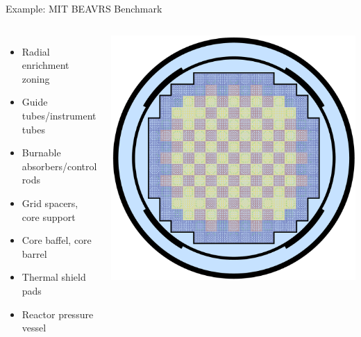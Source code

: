 \documentclass[noamssymb,svgnames]{beamer}
\begin{document}
\begin{frame}{Example: MIT BEAVRS Benchmark}
  \begin{columns}
    \small
    \begin{itemize}
    \item Radial enrichment zoning
    \item Guide tubes/instrument tubes
    \item Burnable absorbers/control rods
    \item Grid spacers, core support
    \item Core baffel, core barrel
    \item Thermal shield pads
    \item Reactor pressure vessel
    \end{itemize}
    \includegraphics[width=\textwidth]{../images/beavrs_lowerres.png}
  \end{columns}
\end{frame}
\end{document}
